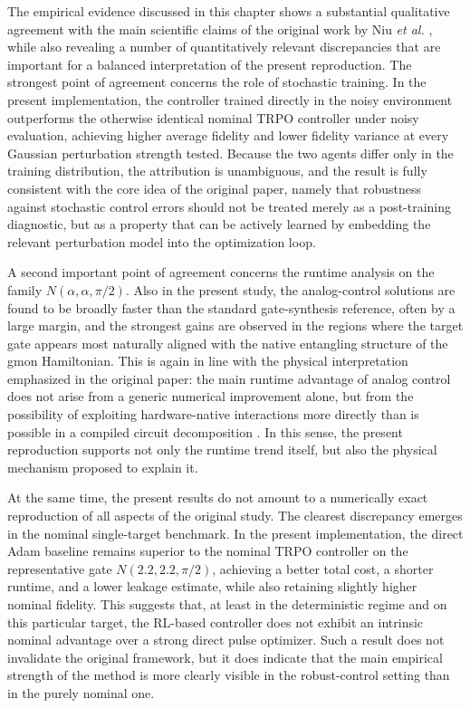 The empirical evidence discussed in this chapter shows a substantial qualitative agreement with the main scientific claims of the original work by Niu \emph{et al.} \cite{Niu2019}, while also revealing a number of quantitatively relevant discrepancies that are important for a balanced interpretation of the present reproduction. The strongest point of agreement concerns the role of stochastic training. In the present implementation, the controller trained directly in the noisy environment outperforms the otherwise identical nominal TRPO controller under noisy evaluation, achieving higher average fidelity and lower fidelity variance at every Gaussian perturbation strength tested. Because the two agents differ only in the training distribution, the attribution is unambiguous, and the result is fully consistent with the core idea of the original paper, namely that robustness against stochastic control errors should not be treated merely as a post-training diagnostic, but as a property that can be actively learned by embedding the relevant perturbation model into the optimization loop.

A second important point of agreement concerns the runtime analysis on the family \(N(\alpha,\alpha,\pi/2)\). Also in the present study, the analog-control solutions are found to be broadly faster than the standard gate-synthesis reference, often by a large margin, and the strongest gains are observed in the regions where the target gate appears most naturally aligned with the native entangling structure of the gmon Hamiltonian. This is again in line with the physical interpretation emphasized in the original paper: the main runtime advantage of analog control does not arise from a generic numerical improvement alone, but from the possibility of exploiting hardware-native interactions more directly than is possible in a compiled circuit decomposition \cite{Niu2019}. In this sense, the present reproduction supports not only the runtime trend itself, but also the physical mechanism proposed to explain it.

At the same time, the present results do not amount to a numerically exact reproduction of all aspects of the original study. The clearest discrepancy emerges in the nominal single-target benchmark. In the present implementation, the direct Adam baseline remains superior to the nominal TRPO controller on the representative gate \(N(2.2,2.2,\pi/2)\), achieving a better total cost, a shorter runtime, and a lower leakage estimate, while also retaining slightly higher nominal fidelity. This suggests that, at least in the deterministic regime and on this particular target, the RL-based controller does not exhibit an intrinsic nominal advantage over a strong direct pulse optimizer. Such a result does not invalidate the original framework, but it does indicate that the main empirical strength of the method is more clearly visible in the robust-control setting than in the purely nominal one.

